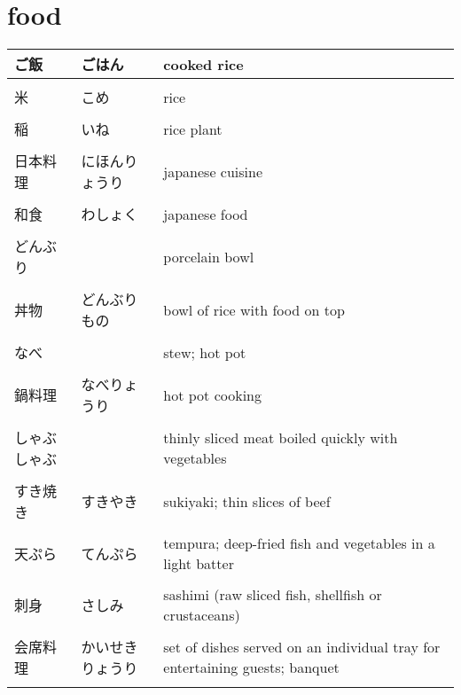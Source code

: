 \documentclass{article}
\newcommand\tabni[1][0.2cm]{\hspace*{#1}}
\begin{document}
\section{ \tabni food}
\begin{tabular}{ l | l | p{11.5cm} }
ご飯            &ごはん                         &cooked rice \\ \hline \\[-1em]
米              &こめ                           &rice \\ \hline \\[-1em]
稲              &いね                           &rice plant \\ \hline \\[-1em]
日本料理        &にほんりょうり                 &japanese cuisine \\ \hline \\[-1em]
和食            &わしょく                       &japanese food \\ \hline \\[-1em]
どんぶり        &                               &porcelain bowl \\ \hline \\[-1em]
丼物            &どんぶりもの                   &bowl of rice with food on top \\ \hline \\[-1em]
なべ            &                               &stew; hot pot \\ \hline \\[-1em]
鍋料理          &なべりょうり                   &hot pot cooking \\ \hline \\[-1em]
しゃぶしゃぶ    &                               &thinly sliced meat boiled quickly with vegetables \\ \hline \\[-1em]
すき焼き        &すきやき                       &sukiyaki; thin slices of beef \\ \hline \\[-1em]
天ぷら          &てんぷら                       &tempura; deep-fried fish and vegetables in a light batter \\ \hline \\[-1em]
刺身            &さしみ                         &sashimi (raw sliced fish, shellfish or crustaceans) \\ \hline \\[-1em]
会席料理        & かいせきりょうり              &set of dishes served on an individual tray for entertaining guests; banquet \\ \hline \\[-1em]

\end{tabular}
\end{document}

